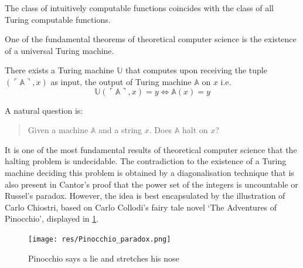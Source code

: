 \begin{churchturing}
  The class of intuitively computable
  functions coincides with the class of all Turing computable functions.
\end{churchturing}

One of the fundamental theorems of theoretical computer science is the
existence of a universal Turing machine.

\begin{thm}
    There exists a Turing machine $\mathbb U$ that computes upon receiving
    the tuple $(\ulcorner \mathbb A \urcorner, x)$ as input, the output of
    Turing machine $\mathbb A$ on $x$ i.e.
    \[ \mathbb U(\ulcorner \mathbb A \urcorner, x) = y \Leftrightarrow \mathbb A (x) = y\]
\end{thm}

A natural question is:

\begin{quote}
  Given a machine $\mathbb A$ and a string $x$. Does $\mathbb A$
  halt on $x$?
\end{quote}

It is one of the most fundamental results of theoretical computer science that
the halting problem is undecidable. The contradiction to the existence of a
Turing machine deciding this problem is obtained by a diagonalisation technique
that is also present in Cantor's proof that the power set of the integers is
uncountable or Russel's paradox. However, the idea is best encapsulated by the
illustration of Carlo Chiostri, based on Carlo Collodi's fairy tale novel ‘The
Adventures of Pinocchio’, displayed in \cref{fig:Pinocchio}.

\begin{figure}
  \texttt{[image: res/Pinocchio\_paradox.png]}
  \caption{Pinocchio says a lie and stretches his nose}
  \label{fig:Pinocchio}
\end{figure}

